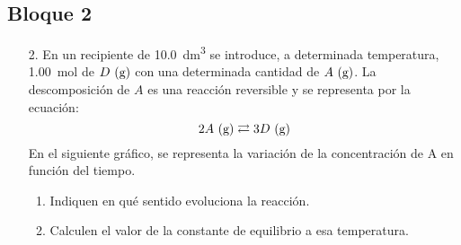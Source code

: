 \documentclass[../practica.root.tex]{subfiles}
\begin{document}
\subsection{Bloque 2}
\begin{enumerate}
    \item[2.] En un recipiente de \SI{10,0}{\dm\cubed} se introduce, a determinada temperatura, \SI{1,00}{\mole} de $D \ \text{(g)}$
          con una determinada cantidad de $A \ \text{(g)}$. La descomposición de $A$ es una reacción reversible
          y se representa por la ecuación:
          \[ 2 A \ \text{(g)} \rightleftarrows{} 3 D \ \text{(g)} \]
          En el siguiente gráfico, se representa la variación de la concentración de A en función del
          tiempo.
          \begin{enumerate}
              \item Indiquen en qué sentido evoluciona la reacción.
              \item Calculen el valor de la constante de equilibrio a esa temperatura.
          \end{enumerate}
          \begin{figure}[h]
              \centering
          \end{figure}


\end{enumerate}
\end{document}
